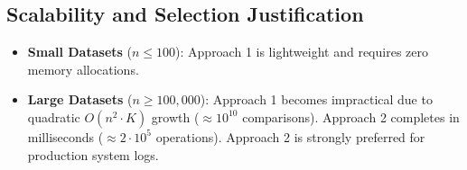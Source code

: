 \subsection{Scalability and Selection Justification}
\begin{itemize}
    \item \textbf{Small Datasets} ($n \le 100$): Approach 1 is lightweight and requires zero memory allocations.
    \item \textbf{Large Datasets} ($n \ge 100,000$): Approach 1 becomes impractical due to quadratic $O(n^2 \cdot K)$ growth ($\approx 10^{10}$ comparisons). Approach 2 completes in milliseconds ($\approx 2 \cdot 10^5$ operations). Approach 2 is strongly preferred for production system logs.
\end{itemize}
